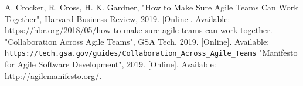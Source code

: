 \documentclass[sigplan,screen]{acmart}
\begin{document}
% 
% 

\begin{thebibliography}{00}
   A. Crocker, R. Cross, H. K. Gardner, "How to Make Sure Agile Teams Can Work Together", Harvard Business Review, 2019. [Online]. Available: https://hbr.org/2018/05/how-to-make-sure-agile-teams-can-work-together.
   "Collaboration Across Agile Teams", GSA Tech, 2019. [Online]. Available: \verb| https://tech.gsa.gov/guides/Collaboration_Across_Agile_Teams|
   "Manifesto for Agile Software Development", 2019. [Online]. Available: http://agilemanifesto.org/.
\end{thebibliography}
\end{document}
